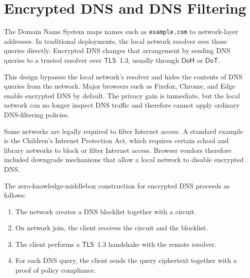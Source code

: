\documentclass[11pt]{article}
\newcommand{\TLS}{\ensuremath{\mathsf{TLS}}}
\newcommand{\DoH}{\ensuremath{\mathsf{DoH}}}
\newcommand{\DoT}{\ensuremath{\mathsf{DoT}}}
\begin{document}
\section{Encrypted DNS and DNS Filtering}

The Domain Name System maps names such as \texttt{example.com} to network-layer
addresses.  In traditional deployments, the local network resolver sees those
queries directly.  Encrypted DNS changes that arrangement by sending DNS
queries to a trusted resolver over \TLS~1.3, usually through \DoH{} or \DoT.

This design bypasses the local network's resolver and hides the contents of DNS
queries from the network.  Major browsers such as Firefox, Chrome, and Edge
enable encrypted DNS by default.  The privacy gain is immediate, but the local
network can no longer inspect DNS traffic and therefore cannot apply ordinary
DNS-filtering policies.

Some networks are legally required to filter Internet access.  A standard
example is the Children's Internet Protection Act, which requires certain
school and library networks to block or filter Internet access.  Browser
vendors therefore included downgrade mechanisms that allow a local network to
disable encrypted DNS.

The zero-knowledge-middlebox construction for encrypted DNS proceeds as
follows:
\begin{enumerate}
  \item The network creates a DNS blocklist together with a circuit.
  \item On network join, the client receives the circuit and the blocklist.
  \item The client performs a \TLS~1.3 handshake with the remote resolver.
  \item For each DNS query, the client sends the query ciphertext together with
        a proof of policy compliance.
\end{enumerate}
\end{document}
